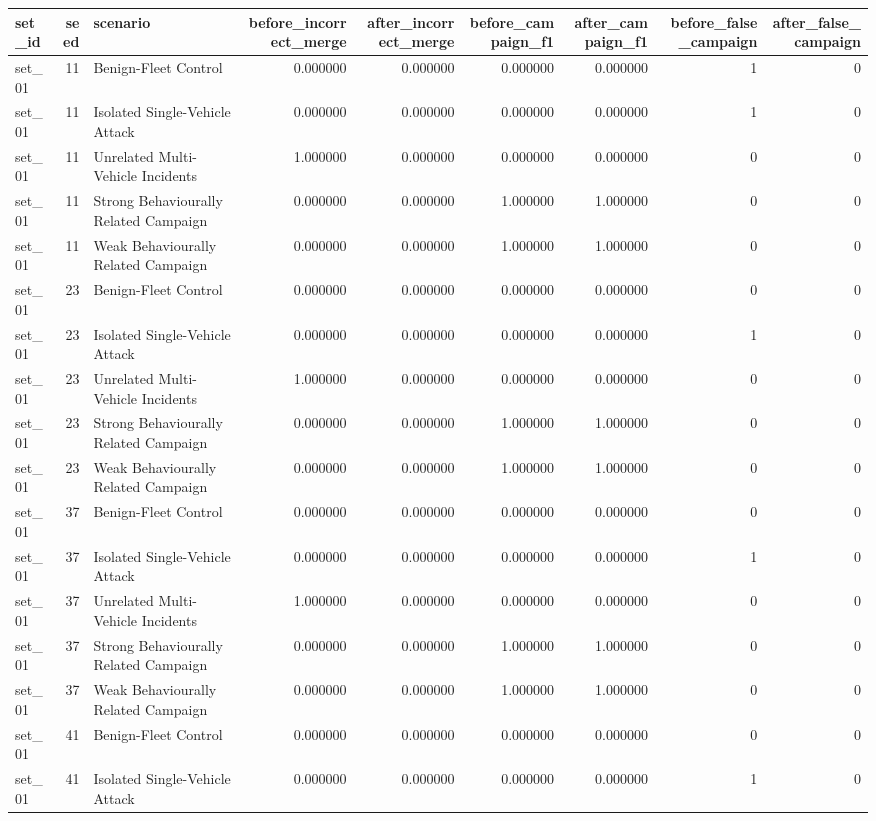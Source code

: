 \begin{tabular}{lrlrrrrrr}
\toprule
set_id & seed & scenario & before_incorrect_merge & after_incorrect_merge & before_campaign_f1 & after_campaign_f1 & before_false_campaign & after_false_campaign \\
\midrule
set_01 & 11 & Benign-Fleet Control & 0.000000 & 0.000000 & 0.000000 & 0.000000 & 1 & 0 \\
set_01 & 11 & Isolated Single-Vehicle Attack & 0.000000 & 0.000000 & 0.000000 & 0.000000 & 1 & 0 \\
set_01 & 11 & Unrelated Multi-Vehicle Incidents & 1.000000 & 0.000000 & 0.000000 & 0.000000 & 0 & 0 \\
set_01 & 11 & Strong Behaviourally Related Campaign & 0.000000 & 0.000000 & 1.000000 & 1.000000 & 0 & 0 \\
set_01 & 11 & Weak Behaviourally Related Campaign & 0.000000 & 0.000000 & 1.000000 & 1.000000 & 0 & 0 \\
set_01 & 23 & Benign-Fleet Control & 0.000000 & 0.000000 & 0.000000 & 0.000000 & 0 & 0 \\
set_01 & 23 & Isolated Single-Vehicle Attack & 0.000000 & 0.000000 & 0.000000 & 0.000000 & 1 & 0 \\
set_01 & 23 & Unrelated Multi-Vehicle Incidents & 1.000000 & 0.000000 & 0.000000 & 0.000000 & 0 & 0 \\
set_01 & 23 & Strong Behaviourally Related Campaign & 0.000000 & 0.000000 & 1.000000 & 1.000000 & 0 & 0 \\
set_01 & 23 & Weak Behaviourally Related Campaign & 0.000000 & 0.000000 & 1.000000 & 1.000000 & 0 & 0 \\
set_01 & 37 & Benign-Fleet Control & 0.000000 & 0.000000 & 0.000000 & 0.000000 & 0 & 0 \\
set_01 & 37 & Isolated Single-Vehicle Attack & 0.000000 & 0.000000 & 0.000000 & 0.000000 & 1 & 0 \\
set_01 & 37 & Unrelated Multi-Vehicle Incidents & 1.000000 & 0.000000 & 0.000000 & 0.000000 & 0 & 0 \\
set_01 & 37 & Strong Behaviourally Related Campaign & 0.000000 & 0.000000 & 1.000000 & 1.000000 & 0 & 0 \\
set_01 & 37 & Weak Behaviourally Related Campaign & 0.000000 & 0.000000 & 1.000000 & 1.000000 & 0 & 0 \\
set_01 & 41 & Benign-Fleet Control & 0.000000 & 0.000000 & 0.000000 & 0.000000 & 0 & 0 \\
set_01 & 41 & Isolated Single-Vehicle Attack & 0.000000 & 0.000000 & 0.000000 & 0.000000 & 1 & 0 \\

\end{tabular}
